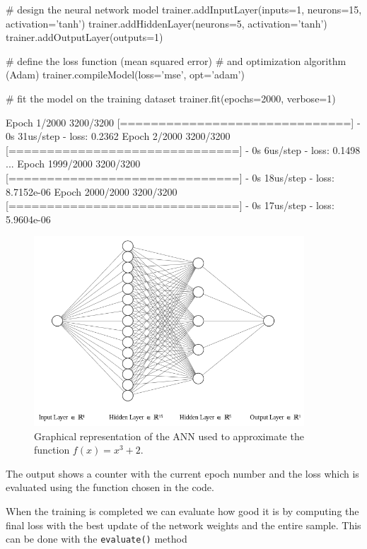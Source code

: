 \begin{ipython}
# design the neural network model
trainer.addInputLayer(inputs=1, neurons=15, activation='tanh')
trainer.addHiddenLayer(neurons=5, activation='tanh')
trainer.addOutputLayer(outputs=1)

# define the loss function (mean squared error)
# and optimization algorithm (Adam)
trainer.compileModel(loss='mse', opt='adam')

# fit the model on the training dataset
trainer.fit(epochs=2000, verbose=1)
\end{ipython}
\begin{ioutput}
Epoch 1/2000
3200/3200 [==============================] - 0s 31us/step - loss: 0.2362
Epoch 2/2000
3200/3200 [==============================] - 0s 6us/step - loss: 0.1498
...
Epoch 1999/2000
3200/3200 [==============================] - 0s 18us/step - loss: 8.7152e-06
Epoch 2000/2000
3200/3200 [==============================] - 0s 17us/step - loss: 5.9604e-06
\end{ioutput}

\begin{figure}[htb]
\centering
\includegraphics[width=0.9\textwidth]{figures/ann_1.png}
\caption{Graphical representation of the ANN used to approximate the function $f(x) = x^3 + 2$.}
\label{fig:ann_1}
\end{figure}

The output shows a counter with the current epoch number and the loss which is evaluated using the function chosen in the code.

When the training is completed we can evaluate how good it is by computing the final loss with the best update of the network weights and the entire sample. This can be done with the \texttt{evaluate()} method

